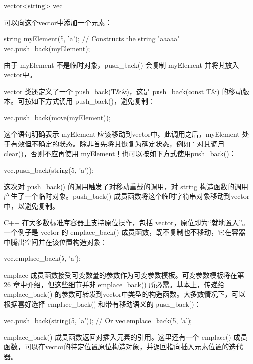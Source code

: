\begin{cpp}
vector<string> vec;
\end{cpp}

可以向这个vector中添加一个元素：

\begin{cpp}
string myElement(5, 'a'); // Constructs the string "aaaaa"
vec.push_back(myElement);
\end{cpp}

由于 myElement 不是临时对象，push\_back() 会复制 myElement 并将其放入vector中。

vector 类还定义了一个 push\_back(T\&\&)，这是 push\_back(const T\&) 的移动版本。可按如下方式调用 push\_back()，避免复制：

\begin{cpp}
vec.push_back(move(myElement));
\end{cpp}

这个语句明确表示 myElement 应该移动到vector中。此调用之后，myElement 处于有效但不确定的状态。除非首先将其恢复为确定状态，例如：对其调用 clear()，否则不应再使用 myElement！也可以按如下方式使用push\_back()：

\begin{cpp}
vec.push_back(string(5, 'a'));
\end{cpp}

这次对 push\_back() 的调用触发了对移动重载的调用，对 string 构造函数的调用产生了一个临时对象。push\_back() 成员函数将这个临时字符串对象移动到vector中，以避免复制。


C++ 在大多数标准库容器上支持原位操作，包括 vector，原位即为“就地置入”。一个例子是 vector 的 emplace\_back() 成员函数，既不复制也不移动，它在容器中腾出空间并在该位置构造对象：

\begin{cpp}
vec.emplace_back(5, 'a');
\end{cpp}

emplace 成员函数接受可变数量的参数作为可变参数模板。可变参数模板将在第 26 章中介绍，但这些细节并非 emplace\_back() 所必需。基本上，传递给 emplace\_back() 的参数可转发到vector中类型的构造函数。大多数情况下，可以根据喜好选择 emplace\_back() 和带有移动语义的 push\_back()：

\begin{cpp}
vec.push_back(string(5, 'a'));
// Or
vec.emplace_back(5, 'a');
\end{cpp}

emplace\_back() 成员函数返回对插入元素的引用。这里还有一个 emplace() 成员函数，可以在vector的特定位置原位构造对象，并返回指向插入元素位置的迭代器。

